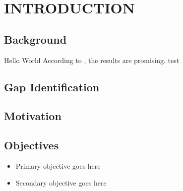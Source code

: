 \chapter{INTRODUCTION}
\section{Background}
Hello World
According to \cite{edcd}, the results are promising.
test



\section{Gap Identification}


\section{Motivation}

\section{Objectives}
\begin{itemize}
  \item Primary objective goes here
  \item Secondary objective goes here
\end{itemize}
